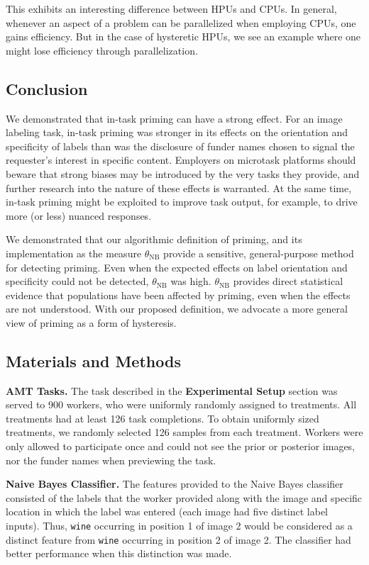 \documentclass[a4paper]{report}
\begin{document}
This exhibits an interesting difference between HPUs and CPUs.  In general,
whenever an aspect of a problem can be parallelized when employing CPUs, one
gains efficiency.  But in the case of hysteretic HPUs, we see an 
example where one might lose efficiency through parallelization.

\subsection*{Conclusion}
We demonstrated that in-task priming can have a strong effect.  
For an image labeling task, in-task priming was stronger in its effects on 
the orientation and specificity of labels than was the disclosure of funder 
names chosen to signal the requester's interest in specific content.
Employers on microtask platforms should 
beware that strong biases may be introduced by the very tasks they provide,
and further research into the nature of these effects is warranted.  At the 
same time, in-task priming might be exploited to improve task output, for 
example, to drive more (or less) nuanced responses.

We demonstrated that our algorithmic definition of priming, and its 
implementation as the measure $\theta_\text{NB}$ provide a sensitive,
general-purpose method for detecting priming.  Even when the expected effects 
on label orientation and specificity could not be detected, $\theta_\text{NB}$ 
was high.  $\theta_\text{NB}$ provides direct statistical evidence that 
populations have been affected by priming, even when the effects are not 
understood. With our proposed definition, we advocate a more general view of 
priming as a form of hysteresis.

\subsection*{Materials and Methods}

\textbf{AMT Tasks.} The task described in the \textbf{Experimental Setup}
section was served to 900 workers, who were uniformly randomly assigned to
treatments.  All treatments had at least 126 task completions.  To obtain 
uniformly sized treatments, we randomly selected 126 samples from each 
treatment. Workers were
only allowed to participate once and could not see the prior or posterior 
images, nor the funder names when previewing the task.

\textbf{Naive Bayes Classifier.}
The features provided to the Naive Bayes classifier consisted of the labels
that the worker provided along with the image and specific location in which 
the label was entered
(each image had five distinct label inputs).  Thus, \texttt{wine} occurring in 
position 1 of image 2 would be considered as a distinct feature from 
\texttt{wine} occurring in position 2 of image 2. The classifier 
had better performance when this distinction was made.
\end{document}
